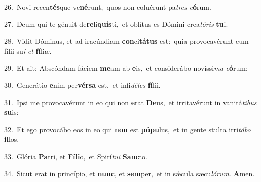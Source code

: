 {\numbfont\textcolor{\numbcolor}{26.}}~Novi recen\-\textbf{tés}\-que ve\-\textbf{né}\-runt,~\star quos non coluérunt pa\textit{tres} \textit{e}\-\textbf{ó}rum.\par
{\numbfont\textcolor{\numbcolor}{27.}}~Deum qui te génuit de\-\textbf{re}\-li\-\textbf{quís}\-ti,~\star et oblítus es Dómini crea\-\textit{tó}\-\textit{ris} \textbf{tu}\-i.\par
{\numbfont\textcolor{\numbcolor}{28.}}~Vidit Dóminus, et ad iracúndiam \textbf{con}\-ci\-\textbf{tá}\-\textbf{tus} est:~\star quia provocavérunt eum fílii su\textit{i} \textit{et} \textbf{fí}\-liæ.\par
{\numbfont\textcolor{\numbcolor}{29.}}~Et ait: Abscóndam fáciem \textbf{me}\-am ab \textbf{e}\-is,~\star et considerábo novíssi\textit{ma} \textit{e}\-\textbf{ó}rum:\par
{\numbfont\textcolor{\numbcolor}{30.}}~Generátio \textbf{e}\-nim per\-\textbf{vér}\-\textbf{sa} est,~\star et infi\-\textit{dé}\-\textit{les} \textbf{fí}\-lii.\par
{\numbfont\textcolor{\numbcolor}{31.}}~Ipsi me provocavérunt in eo qui non \textbf{e}\-rat \textbf{De}\-us,~\star et irritavérunt in vanitá\-\textit{ti}\-\textit{bus} \textbf{su}\-is:\par
{\numbfont\textcolor{\numbcolor}{32.}}~Et ego provocábo eos in eo qui \textbf{non} est \textbf{pó}\-\textbf{pu}lus,~\star et in gente stulta irri\-\textit{tá}\-\textit{bo} \textbf{il}\-los.\par
{\numbfont\textcolor{\numbcolor}{33.}}~Glória \textbf{Pa}\-tri, et \textbf{Fí}\-\textbf{li}o,~\star et Spirí\-\textit{tu}\-\textit{i} \textbf{Sanc}\-to.\par
{\numbfont\textcolor{\numbcolor}{34.}}~Sicut erat in princípio, et \textbf{nunc}\-, et \textbf{sem}\-per,~\star et in sǽcula sæcu\-\textit{ló}\-\textit{rum}. \textbf{A}\-men.\par
